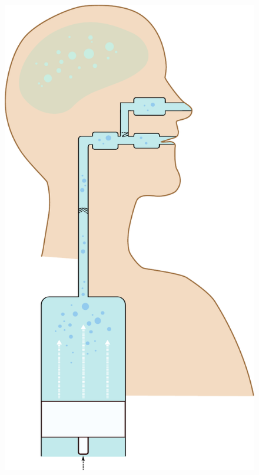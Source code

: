 \documentclass[12pt]{report}
\numberwithin{equation}{section}
\numberwithin{figure}{section}
\begin{document}
\begin{figure}[ht]
\begin{changemargin}{0cm}{0cm}
{                \includegraphics[width=0.28\paperwidth,valign=t]{tubes}%
}
\end{changemargin}
\end{figure}
\end{document}

